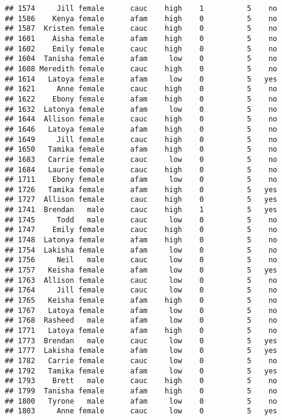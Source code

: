\documentclass[
]{article}
\begin{document}
\begin{verbatim}
## 1574     Jill female      cauc    high    1          5    no
## 1586    Kenya female      afam    high    0          5    no
## 1587  Kristen female      cauc    high    0          5    no
## 1601    Aisha female      afam    high    0          5    no
## 1602    Emily female      cauc    high    0          5    no
## 1604  Tanisha female      afam     low    0          5    no
## 1608 Meredith female      cauc    high    0          5    no
## 1614   Latoya female      afam     low    0          5   yes
## 1621     Anne female      cauc    high    0          5    no
## 1622    Ebony female      afam    high    0          5    no
## 1632  Latonya female      afam     low    0          5    no
## 1644  Allison female      cauc    high    0          5    no
## 1646   Latoya female      afam    high    0          5    no
## 1649     Jill female      cauc    high    0          5    no
## 1650   Tamika female      afam    high    0          5    no
## 1683   Carrie female      cauc     low    0          5    no
## 1684   Laurie female      cauc    high    0          5    no
## 1711    Ebony female      afam     low    0          5    no
## 1726   Tamika female      afam    high    0          5   yes
## 1727  Allison female      cauc    high    0          5   yes
## 1741  Brendan   male      cauc    high    1          5   yes
## 1745     Todd   male      cauc     low    0          5    no
## 1747    Emily female      cauc    high    0          5    no
## 1748  Latonya female      afam    high    0          5    no
## 1754  Lakisha female      afam     low    0          5    no
## 1756     Neil   male      cauc     low    0          5    no
## 1757   Keisha female      afam     low    0          5   yes
## 1763  Allison female      cauc     low    0          5    no
## 1764     Jill female      cauc     low    0          5    no
## 1765   Keisha female      afam    high    0          5    no
## 1767   Latoya female      afam     low    0          5    no
## 1768  Rasheed   male      afam     low    0          5    no
## 1771   Latoya female      afam    high    0          5    no
## 1773  Brendan   male      cauc     low    0          5   yes
## 1777  Lakisha female      afam     low    0          5   yes
## 1782   Carrie female      cauc     low    0          5    no
## 1792   Tamika female      afam     low    0          5   yes
## 1793    Brett   male      cauc    high    0          5    no
## 1799  Tanisha female      afam    high    0          5    no
## 1800   Tyrone   male      afam     low    0          5    no
## 1803     Anne female      cauc     low    0          5   yes

\end{verbatim}
\end{document}
